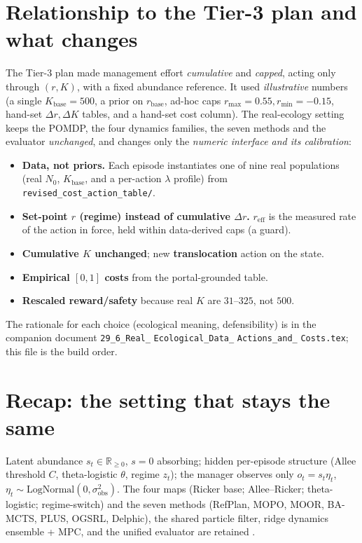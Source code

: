 \documentclass[11pt]{article}
\newcommand{\reff}{r_{\mathrm{eff}}}
\newcommand{\rbase}{r_{\mathrm{base}}}
\newcommand{\Kbase}{K_{\mathrm{base}}}
\newcommand{\rmax}{r_{\max}}
\newcommand{\rmin}{r_{\min}}
\newcommand{\sobs}{\sigma_{\mathrm{obs}}}
\newcommand{\code}[1]{\texttt{#1}}
\begin{document}
\section{Relationship to the Tier-3 plan and what changes}
The Tier-3 plan made management effort \emph{cumulative} and \emph{capped}, acting
only through $(r,K)$, with a fixed abundance reference. It used \emph{illustrative}
numbers (a single $\Kbase{=}500$, a prior on $\rbase$, ad-hoc caps
$\rmax{=}0.55,\rmin{=}{-}0.15$, hand-set $\Delta r,\Delta K$ tables, and a hand-set
cost column). The real-ecology setting keeps the POMDP, the four dynamics families,
the seven methods and the evaluator \emph{unchanged}, and changes only the
\emph{numeric interface and its calibration}:
\begin{itemize}[nosep,leftmargin=1.4em]
\item \textbf{Data, not priors.} Each episode instantiates one of nine real
populations (real $N_0$, $\Kbase$, and a per-action $\lambda$ profile) from
\code{revised\_cost\_action\_table/}.
\item \textbf{Set-point $r$ (regime) instead of cumulative $\Delta r$.}
$\reff$ is the measured rate of the action in force, held within data-derived caps (a guard).
\item \textbf{Cumulative $K$ unchanged}; new \textbf{translocation} action on the state.
\item \textbf{Empirical $[0,1]$ costs} from the portal-grounded table.
\item \textbf{Rescaled reward/safety} because real $K$ are $31$--$325$, not $500$.
\end{itemize}
The rationale for each choice (ecological meaning, defensibility) is in the
companion document
\texttt{29\_6\_Real\_}\allowbreak
\texttt{Ecological\_Data\_}\allowbreak
\texttt{Actions\_and\_}\allowbreak
\texttt{Costs.tex};
this file is the build order.

\section{Recap: the setting that stays the same}
Latent abundance $s_t\in\mathbb{R}_{\ge0}$, $s{=}0$ absorbing; hidden per-episode
structure (Allee threshold $C$, theta-logistic $\theta$, regime $z_t$); the manager
observes only $o_t=s_t\eta_t$, $\eta_t\sim\mathrm{LogNormal}(0,\sobs^2)$. The four
maps (Ricker base; Allee--Ricker; theta-logistic; regime-switch) and the seven
methods (RefPlan, MOPO, MOOR, BA-MCTS, PLUS, OGSRL, Delphic), the shared particle
filter, ridge dynamics ensemble + MPC, and the unified evaluator are retained
\cite{ricker1954,plus2018,moor2025,mopo2020,refplan2025,bamcts2026,ogsrl2025,delphic2024}.
\end{document}
